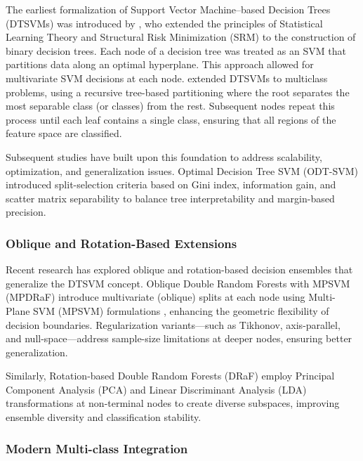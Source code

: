 The earliest formalization of Support Vector Machine--based Decision Trees (DTSVMs) was introduced by \citet{bennet1998} , who extended the principles of Statistical Learning Theory \citep{vapnik2013} and Structural Risk Minimization (SRM) to the construction of binary decision trees. Each node of a decision tree was treated as an SVM that partitions data along an optimal hyperplane. This approach allowed for multivariate SVM decisions at each node. \citet{takahashi2002} extended DTSVMs to multiclass problems, using a recursive tree-based partitioning where the root separates the most separable class (or classes) from the rest. Subsequent nodes repeat this process until each leaf contains a single class, ensuring that all regions of the feature space are classified.

Subsequent studies have built upon this foundation to address scalability, optimization, and generalization issues. Optimal Decision Tree SVM (ODT-SVM) \citep{bala2011} introduced split-selection criteria based on Gini index, information gain, and scatter matrix separability to balance tree interpretability and margin-based precision.

\subsubsection{Oblique and Rotation-Based Extensions}\label{oblique-and-rotation-based-extensions}

Recent research has explored oblique and rotation-based decision ensembles that generalize the DTSVM concept. Oblique Double Random Forests with MPSVM (MPDRaF) \citep{ganaie2022} introduce multivariate (oblique) splits at each node using Multi-Plane SVM (MPSVM) formulations \citep{Mangasarian2006}, enhancing the geometric flexibility of decision boundaries. Regularization variants---such as Tikhonov, axis-parallel, and null-space---address sample-size limitations at deeper nodes, ensuring better generalization.

Similarly, Rotation-based Double Random Forests (DRaF) \citep{ganaie2022} employ Principal Component Analysis (PCA) and Linear Discriminant Analysis (LDA) transformations at non-terminal nodes to create diverse subspaces, improving ensemble diversity and classification stability.

\subsubsection{Modern Multi-class Integration}\label{modern-multi-class-integration}

